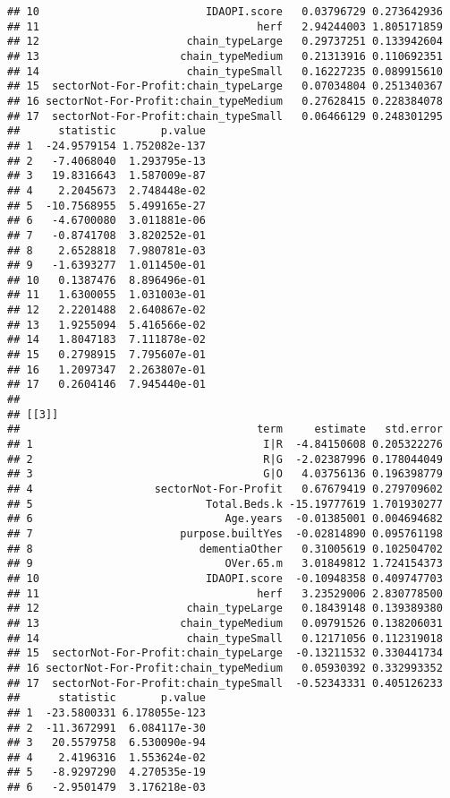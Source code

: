 \documentclass[]{article}
\begin{document}
\begin{verbatim}
## 10                          IDAOPI.score   0.03796729 0.273642936
## 11                                  herf   2.94244003 1.805171859
## 12                       chain_typeLarge   0.29737251 0.133942604
## 13                      chain_typeMedium   0.21313916 0.110692351
## 14                       chain_typeSmall   0.16227235 0.089915610
## 15  sectorNot-For-Profit:chain_typeLarge   0.07034804 0.251340367
## 16 sectorNot-For-Profit:chain_typeMedium   0.27628415 0.228384078
## 17  sectorNot-For-Profit:chain_typeSmall   0.06466129 0.248301295
##      statistic       p.value
## 1  -24.9579154 1.752082e-137
## 2   -7.4068040  1.293795e-13
## 3   19.8316643  1.587009e-87
## 4    2.2045673  2.748448e-02
## 5  -10.7568955  5.499165e-27
## 6   -4.6700080  3.011881e-06
## 7   -0.8741708  3.820252e-01
## 8    2.6528818  7.980781e-03
## 9   -1.6393277  1.011450e-01
## 10   0.1387476  8.896496e-01
## 11   1.6300055  1.031003e-01
## 12   2.2201488  2.640867e-02
## 13   1.9255094  5.416566e-02
## 14   1.8047183  7.111878e-02
## 15   0.2798915  7.795607e-01
## 16   1.2097347  2.263807e-01
## 17   0.2604146  7.945440e-01
## 
## [[3]]
##                                     term     estimate   std.error
## 1                                    I|R  -4.84150608 0.205322276
## 2                                    R|G  -2.02387996 0.178044049
## 3                                    G|O   4.03756136 0.196398779
## 4                   sectorNot-For-Profit   0.67679419 0.279709602
## 5                           Total.Beds.k -15.19777619 1.701930277
## 6                              Age.years  -0.01385001 0.004694682
## 7                       purpose.builtYes  -0.02814890 0.095761198
## 8                          dementiaOther   0.31005619 0.102504702
## 9                              OVer.65.m   3.01849812 1.724154373
## 10                          IDAOPI.score  -0.10948358 0.409747703
## 11                                  herf   3.23529006 2.830778500
## 12                       chain_typeLarge   0.18439148 0.139389380
## 13                      chain_typeMedium   0.09791526 0.138206031
## 14                       chain_typeSmall   0.12171056 0.112319018
## 15  sectorNot-For-Profit:chain_typeLarge  -0.13211532 0.330441734
## 16 sectorNot-For-Profit:chain_typeMedium   0.05930392 0.332993352
## 17  sectorNot-For-Profit:chain_typeSmall  -0.52343331 0.405126233
##      statistic       p.value
## 1  -23.5800331 6.178055e-123
## 2  -11.3672991  6.084117e-30
## 3   20.5579758  6.530090e-94
## 4    2.4196316  1.553624e-02
## 5   -8.9297290  4.270535e-19
## 6   -2.9501479  3.176218e-03

\end{verbatim}
\end{document}
